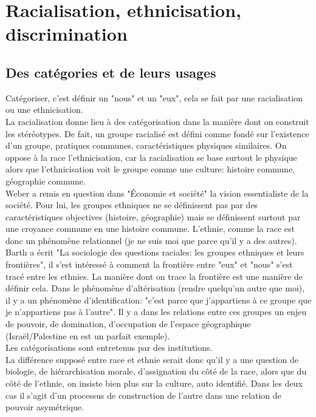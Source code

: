 \documentclass[12pt, a4paper, openany]{book}
\begin{document}
\section{Racialisation, ethnicisation, discrimination}

\subsection{Des catégories et de leurs usages}

Catégoriser, c'est définir un "nous" et un "eux", cela se fait par une racialisation ou une ethnicisation. \\
La racialisation donne lieu à des catégorisation dans la manière dont on construit les stéréotypes. De fait, un groupe racialisé est défini comme fondé sur l'existence d'un groupe, pratiques communes, caractéristiques physiques similaires. On oppose à la race l'ethnicisation, car la racialisation se base surtout le physique alors que l'ethnicisation voit le groupe comme une culture: histoire commune, géographie commune. \\
Weber a remis en question dans "Économie et société" la vision essentialiste de la société. Pour lui, les groupes ethniques ne se définissent pas par des caractéristiques objectives (histoire, géographie) mais se définissent surtout par une croyance commune en une histoire commune. L'ethnie, comme la race est donc un phénomène relationnel (je ne suis moi que parce qu'il y a des  autres). \\
Barth a écrit "La sociologie des questions raciales: les groupes ethniques et leurs frontières", il s'est intéressé à comment la frontière entre "eux" et "nous" s'est tracé entre les ethnies. La manière dont on trace la frontière est une manière de définir cela. Dans le phénomène d'altérisation (rendre quelqu'un autre que moi), il y a un phénomène d'identification: "c'est parce que j'appartiens à ce groupe que je n'appartiens pas à l'autre". Il y a dans les relations entre ces groupes un enjeu de pouvoir, de domination, d'occupation de l'espace géographique (Israël/Palestine en est un parfait exemple). \\
Les catégorisations sont entretenus par des institutions. \\
La différence supposé entre race et ethnie serait donc qu'il y a une question de biologie, de hiérarchisation morale, d'assignation du côté de la race, alors que du côté de l'ethnie, on insiste bien plus sur la culture, auto identifié. Dans les deux cas il s'agit d'un processus de construction de l'autre dans une relation de pouvoir asymétrique. 
\end{document}
